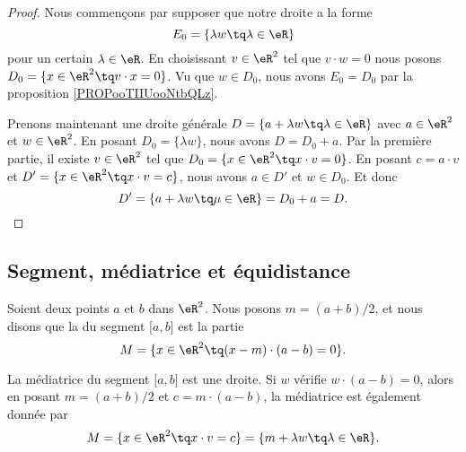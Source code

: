 \begin{proof}
	Nous commençons par supposer que notre droite a la forme
	\begin{equation}
		E_0=\{ \lambda w\tq \lambda\in \eR \}
	\end{equation}
	pour un certain \( \lambda\in \eR\). En choisissant \( v\in \eR^2\) tel que \( v\cdot w=0\) nous posons \( D_0=\{ x\in \eR^2\tq v\cdot x=0 \}\). Vu que \( w\in D_0\), nous avons \( E_0=D_0\) par la proposition \ref{PROPooTIIUooNtbQLz}.

	Prenons maintenant une droite générale  \( D=\{ a+\lambda w\tq \lambda\in \eR \}\) avec \( a\in \eR^2\) et \( w\in \eR^2\). En posant \( D_0=\{ \lambda w \}\), nous avons \( D=D_0+a\). Par la première partie, il existe \( v\in \eR^2\) tel que \( D_0=\{ x\in \eR^2\tq x\cdot v=0 \}\). En posant \( c=a\cdot v\) et \( D'=\{ x\in \eR^2\tq x\cdot v=c \}\), nous avons \( a\in D'\) et \( w\in D_0\). Et donc
	\begin{equation}
		D'=\{ a+\lambda w\tq \mu \in \eR \}=D_0+a=D.
	\end{equation}
\end{proof}

\subsection{Segment, médiatrice et équidistance}

\begin{definition}	\label{DEFooDLBFooYmJPhQ}
	Soient deux points \( a\) et \( b\) dans \( \eR^2\). Nous posons \( m=(a+b)/2\), et nous disons que la  du segment \( \mathopen[a,b\mathclose]\) est la partie
	\begin{equation}		\label{EQooTOACooUQjNJa}
		M=\{ x\in \eR^2\tq (x-m)\cdot (a-b)=0 \}.
	\end{equation}
\end{definition}

\begin{proposition}	\label{PROPooPOKCooMoEfOB}
	La médiatrice du segment \( \mathopen[ a,b\mathclose]\) est une droite. Si \( w\) vérifie \( w\cdot (a-b)=0\), alors en posant \( m=(a+b)/2\) et \( c=m\cdot(a-b)\), la médiatrice est  également donnée par
	\begin{equation}		\label{EQooYJKWooIMBdjO}
		M=\{ x\in \eR^2\tq x\cdot v=c \}=\{ m+\lambda w\tq \lambda\in \eR \}.
	\end{equation}
\end{proposition}

